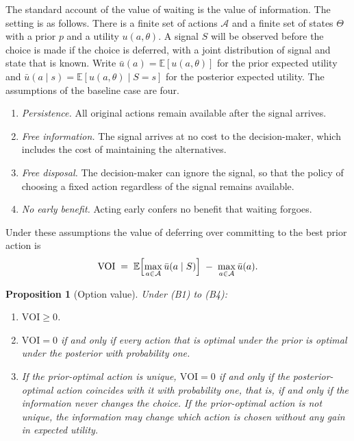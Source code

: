 \documentclass[11pt]{article}
\newtheorem{proposition}{Proposition}
\theoremstyle{remark}
\newcommand{\E}{\mathbb{E}}
\begin{document}
The standard account of the value of waiting is the value of information. The setting is as follows. There is a finite set of actions $\mathcal A$ and a finite set of states $\Theta$ with a prior $p$ and a utility $u(a,\theta)$. A signal $S$ will be observed before the choice is made if the choice is deferred, with a joint distribution of signal and state that is known. Write $\bar u(a)=\E[u(a,\theta)]$ for the prior expected utility and $\bar u(a\mid s)=\E[u(a,\theta)\mid S=s]$ for the posterior expected utility. The assumptions of the baseline case are four.

\begin{enumerate}
\item[(B1)] \emph{Persistence.} All original actions remain available after the signal arrives.
\item[(B2)] \emph{Free information.} The signal arrives at no cost to the decision-maker, which includes the cost of maintaining the alternatives.
\item[(B3)] \emph{Free disposal.} The decision-maker can ignore the signal, so that the policy of choosing a fixed action regardless of the signal remains available.
\item[(B4)] \emph{No early benefit.} Acting early confers no benefit that waiting forgoes.
\end{enumerate}

Under these assumptions the value of deferring over committing to the best prior action is
\[
\mathrm{VOI} \;=\; \E\Bigl[\max_{a\in\mathcal A}\bar u(a\mid S)\Bigr] \;-\; \max_{a\in\mathcal A}\bar u(a).
\]

\begin{proposition}[Option value]
Under (B1) to (B4):
\begin{enumerate}
\item[(a)] $\mathrm{VOI}\ge 0$.
\item[(b)] $\mathrm{VOI}=0$ if and only if every action that is optimal under the prior is optimal under the posterior with probability one.
\item[(c)] If the prior-optimal action is unique, $\mathrm{VOI}=0$ if and only if the posterior-optimal action coincides with it with probability one, that is, if and only if the information never changes the choice. If the prior-optimal action is not unique, the information may change which action is chosen without any gain in expected utility.
\end{enumerate}
\end{proposition}
\end{document}
